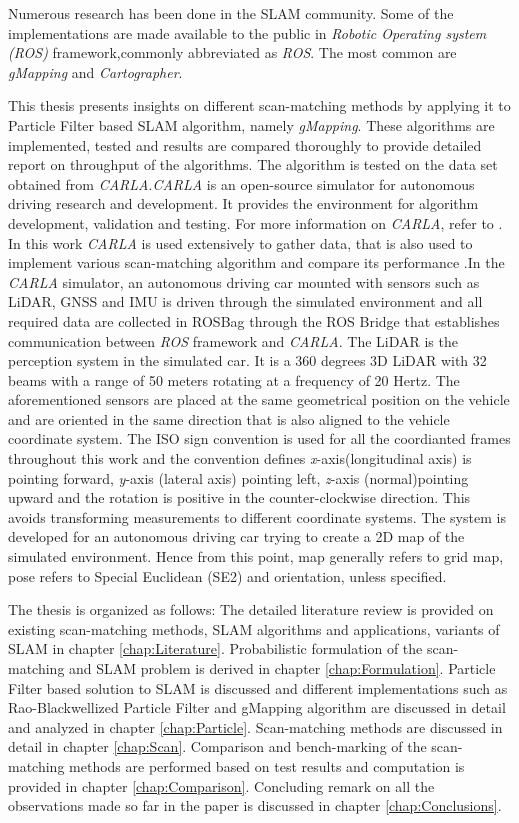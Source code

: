 Numerous research has been done in the SLAM community. Some of the implementations are made available to the public in \textit{Robotic Operating system (ROS)} framework,commonly abbreviated as \textit{ROS}. The most common are \textit{gMapping}\cite{gmap_ros} and \textit{Cartographer}\cite{cartographer_ros}.

This thesis presents insights on different scan-matching methods by applying it to Particle Filter based SLAM algorithm, namely \textit{gMapping}. These algorithms are implemented, tested and results are compared thoroughly to provide detailed report on throughput of the algorithms. The algorithm is tested on the data set obtained from \textit{CARLA}\cite{Dosovitskiy17}.\textit{CARLA} is an open-source simulator for autonomous driving research and development. It provides the environment for algorithm development, validation and testing. For more information on \textit{CARLA}, refer to \cite{Dosovitskiy17}. In this work  \textit{CARLA} is used extensively to gather data, that is also used to implement various scan-matching algorithm and compare its performance .In the \textit{CARLA} simulator, an autonomous driving car mounted with sensors such as LiDAR, GNSS and IMU is driven through the simulated environment and all required data are collected in ROSBag through the ROS Bridge that establishes communication between  \textit{ROS} framework and \textit{CARLA}. The LiDAR is the perception system in the simulated car. It is a 360 degrees 3D LiDAR with 32 beams with a range of 50 meters rotating at a  frequency of 20 Hertz. The aforementioned sensors are placed at the same geometrical position on the vehicle and are oriented in the same direction that is also aligned to the vehicle coordinate system. The ISO sign convention is used for all the coordianted frames throughout this work and the convention defines  \textit{x}-axis(longitudinal axis) is pointing forward,  \textit{y}-axis (lateral axis) pointing left,  \textit{z}-axis (normal)pointing upward and the rotation is positive in the counter-clockwise direction. This avoids transforming measurements to different coordinate systems. The system is developed for an autonomous driving car trying to create a 2D map of the simulated environment. Hence from this point, map generally refers to grid map, pose refers to Special Euclidean (SE2) and orientation, unless specified. 

 The thesis is organized as follows: The detailed literature review is provided on existing scan-matching methods, SLAM algorithms and applications, variants of SLAM in chapter \ref{chap:Literature}. Probabilistic formulation of the scan-matching and SLAM problem is derived in chapter \ref{chap:Formulation}. Particle Filter based solution to SLAM is discussed and different implementations such as Rao-Blackwellized Particle Filter and gMapping algorithm are discussed in detail and analyzed in chapter \ref{chap:Particle}. Scan-matching methods are discussed in detail in chapter \ref{chap:Scan}. Comparison and bench-marking of the scan-matching methods are performed based on test results and computation is provided in chapter \ref{chap:Comparison}. Concluding remark on all the observations made so far in the paper is discussed in chapter \ref{chap:Conclusions}.